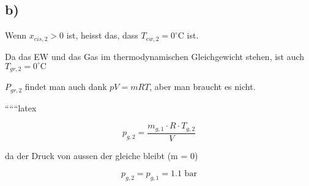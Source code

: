 

\subsection*{b)}

Wenn $x_{eis,2} > 0$ ist, heisst das, dass $T_{ew,2} = 0^\circ \text{C}$ ist.

Da das EW und das Gas im thermodynamischen Gleichgewicht stehen, ist auch $T_{gr,2} = 0^\circ \text{C}$

$P_{gr,2}$ findet man auch dank $pV = mRT$, aber man braucht es nicht.

``````latex


\[
p_{g,2} = \frac{m_{g,1} \cdot R \cdot T_{g,2}}{V}
\]

da der Druck von aussen der gleiche bleibt (\Delta m = 0)

\[
p_{g,2} = p_{g,1} = 1.1 \text{ bar}
\]